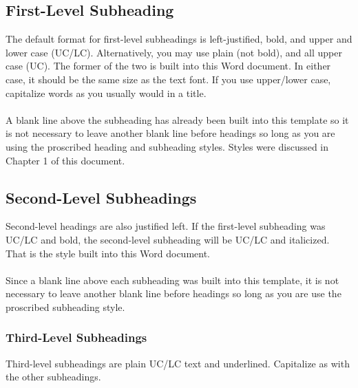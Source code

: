 \documentclass[a4paper,12pt,one side]{report}
\theoremstyle{definition}
\begin{document}
\begin{justify}
\begin{appendix}
\section{First-Level Subheading}
The default format for first-level subheadings is left-justified, bold, and upper and lower case (UC/LC). Alternatively, you may use plain (not bold), and all upper case (UC).  The former of the two is built into this Word document. In either case, it should be the same size as the text font.  If you use upper/lower case, capitalize words as you usually would in a title.\\~\\
	A blank line above the subheading has already been built into this template so it is not necessary to leave another blank line before headings so long as you are using the proscribed heading and subheading styles. Styles were discussed in Chapter 1 of this document.
 \subsection{Second-Level Subheadings}
 Second-level headings are also justified left. If the first-level subheading was UC/LC and bold, the second-level subheading will be UC/LC and italicized. That is the style built into this Word document.\\~\\
	Since a blank line above each subheading was built into this template, it is not necessary to leave another blank line before headings so long as you are use the proscribed subheading style.
\subsubsection{Third-Level Subheadings}
Third-level subheadings are plain UC/LC text and underlined. Capitalize as with the other subheadings. 

\end{appendix}
\end{justify}
\end{document}
